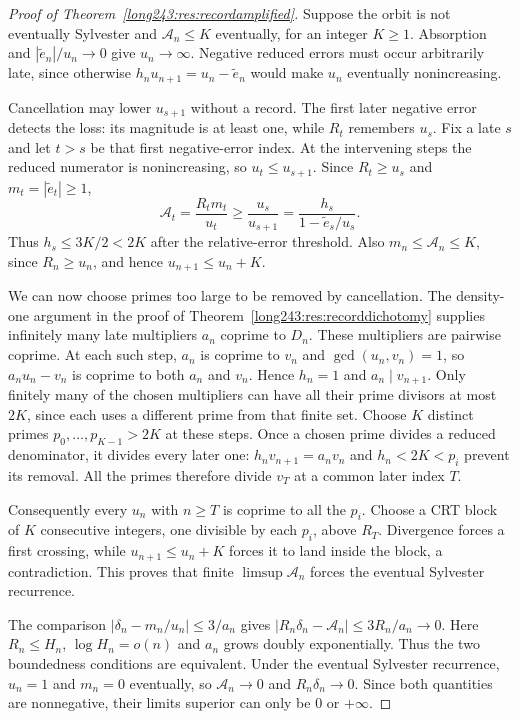 \documentclass[11pt]{article}
\begin{document}
\begin{proof}[Proof of Theorem~\ref{long243:res:recordamplified}]
Suppose the orbit is not eventually Sylvester and
$\mathcal A_n\le K$ eventually, for an integer $K\ge1$.
Absorption and $|\tilde e_n|/u_n\to0$ give $u_n\to\infty$.
Negative reduced errors must occur arbitrarily late, since otherwise
$h_nu_{n+1}=u_n-\tilde e_n$ would make $u_n$ eventually nonincreasing.

Cancellation may lower $u_{s+1}$ without a record. The first later
negative error detects the loss: its magnitude is at least one, while
$R_t$ remembers $u_s$. Fix a late $s$ and let $t>s$ be that first
negative-error index.
At the intervening steps the reduced numerator is nonincreasing, so
$u_t\le u_{s+1}$. Since $R_t\ge u_s$ and
$m_t=|\tilde e_t|\ge1$,
\[
 \mathcal A_t=\frac{R_tm_t}{u_t}\ge\frac{u_s}{u_{s+1}}
 =\frac{h_s}{1-\tilde e_s/u_s}.
\]
Thus $h_s\le3K/2<2K$ after the relative-error threshold.
Also $m_n\le\mathcal A_n\le K$, since $R_n\ge u_n$, and hence
$u_{n+1}\le u_n+K$.

We can now choose primes too large to be removed by cancellation.
The density-one argument in the proof of
Theorem~\ref{long243:res:recorddichotomy} supplies infinitely many
late multipliers $a_n$ coprime to $D_n$. These multipliers are pairwise
coprime. At each such step, $a_n$ is coprime to $v_n$ and
$\gcd(u_n,v_n)=1$, so $a_nu_n-v_n$ is coprime to both $a_n$ and $v_n$.
Hence $h_n=1$ and $a_n\mid v_{n+1}$.
Only finitely many of the chosen multipliers can have all their prime
divisors at most $2K$, since each uses a different prime from that finite
set. Choose $K$ distinct primes $p_0,\ldots,p_{K-1}>2K$ at these
steps. Once a chosen prime divides a reduced denominator, it divides
every later one: $h_nv_{n+1}=a_nv_n$ and $h_n<2K<p_i$ prevent its
removal. All the primes therefore divide $v_T$ at a common later index $T$.

Consequently every $u_n$ with $n\ge T$
is coprime to all the $p_i$. Choose a CRT block of $K$ consecutive
integers, one divisible by each $p_i$, above $R_T$.
Divergence forces a first crossing, while
$u_{n+1}\le u_n+K$ forces it to land inside the block, a contradiction.
This proves that finite $\limsup\mathcal A_n$ forces the eventual Sylvester recurrence.

The comparison
$|\delta_n-m_n/u_n|\le3/a_n$ gives
$|R_n\delta_n-\mathcal A_n|\le3R_n/a_n\to0$.
Here $R_n\le H_n$, $\log H_n=o(n)$ and $a_n$ grows doubly
exponentially. Thus the two boundedness conditions are equivalent.
Under the eventual Sylvester recurrence, $u_n=1$ and $m_n=0$ eventually, so
$\mathcal A_n\to0$ and $R_n\delta_n\to0$. Since both quantities are
nonnegative, their limits superior can only be $0$ or $+\infty$.
\end{proof}
\end{document}
